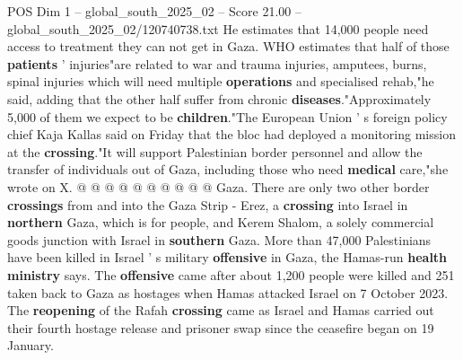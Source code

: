 \begin{textsample}{POS Dim 1 – global\_south\_2025\_02 – Score 21.00 – global\_south\_2025\_02/120740738.txt}
He estimates that 14,000 people need access to treatment they can not get in Gaza.
WHO estimates that half of those \textbf{patients} ' injuries"are related to war and trauma injuries, amputees, burns, spinal injuries which will need multiple \textbf{operations} and specialised rehab,"he said, adding that the other half suffer from chronic \textbf{diseases}."Approximately 5,000 of them we expect to be \textbf{children}."The European Union ' s foreign policy chief Kaja Kallas said on Friday that the bloc had deployed a monitoring mission at the \textbf{crossing}."It will support Palestinian border personnel and allow the transfer of individuals out of Gaza, including those who need \textbf{medical} care,"she wrote on X. @ @ @ @ @ @ @ @ @ @ Gaza.
There are only two other border \textbf{crossings} from and into the Gaza Strip - Erez, a \textbf{crossing} into Israel in \textbf{northern} Gaza, which is for people, and Kerem Shalom, a solely commercial goods junction with Israel in \textbf{southern} Gaza.
More than 47,000 Palestinians have been killed in Israel ' s military \textbf{offensive} in Gaza, the Hamas-run \textbf{health} \textbf{ministry} says.
The \textbf{offensive} came after about 1,200 people were killed and 251 taken back to Gaza as hostages when Hamas attacked Israel on 7 October 2023.
The \textbf{reopening} of the Rafah \textbf{crossing} came as Israel and Hamas carried out their fourth hostage release and prisoner swap since the ceasefire began on 19 January.

\end{textsample}

